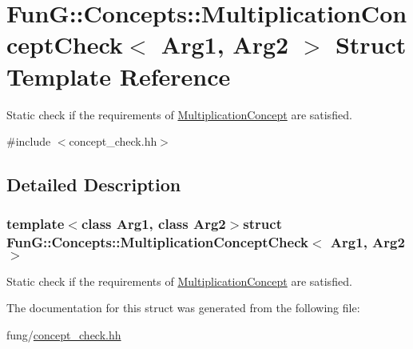 \hypertarget{structFunG_1_1Concepts_1_1MultiplicationConceptCheck}{}\section{Fun\+G\+:\+:Concepts\+:\+:Multiplication\+Concept\+Check$<$ Arg1, Arg2 $>$ Struct Template Reference}
\label{structFunG_1_1Concepts_1_1MultiplicationConceptCheck}


Static check if the requirements of \hyperlink{structFunG_1_1Concepts_1_1MultiplicationConcept}{Multiplication\+Concept} are satisfied.  




{\ttfamily \#include $<$concept\+\_\+check.\+hh$>$}



\subsection{Detailed Description}
\subsubsection*{template$<$class Arg1, class Arg2$>$struct Fun\+G\+::\+Concepts\+::\+Multiplication\+Concept\+Check$<$ Arg1, Arg2 $>$}

Static check if the requirements of \hyperlink{structFunG_1_1Concepts_1_1MultiplicationConcept}{Multiplication\+Concept} are satisfied. 

The documentation for this struct was generated from the following file\+:\begin{DoxyCompactItemize}
\item 
fung/\hyperlink{concept__check_8hh}{concept\+\_\+check.\+hh}\end{DoxyCompactItemize}
